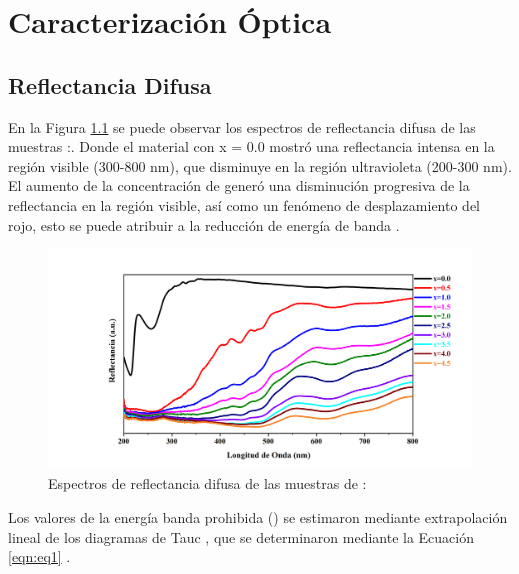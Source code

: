 \chapter{Caracterización Óptica}
\section{Reflectancia Difusa}

En la Figura \ref{fig:reflectancia} se puede observar los espectros de
reflectancia difusa de las muestras :.
Donde el material con x = 0.0 mostró una reflectancia intensa en la región
visible (300-800 nm), que disminuye en la región ultravioleta (200-300 nm).  El
aumento de la
concentración de  generó una disminución progresiva de la
reflectancia en
la región visible, así como un fenómeno de desplazamiento del rojo, esto se
puede atribuir a la reducción de energía de banda \cite{Zhou2017}.\\

\begin{figure}[h]
    \centering%

    \includegraphics[width=\textwidth]{Kap4/ReflectanciaDifusa.png}%
    \caption{Espectros de reflectancia difusa de las muestras de
    :} \label{fig:reflectancia}
\end{figure}

Los valores de la energía banda prohibida () se estimaron mediante
extrapolación
lineal de los diagramas de Tauc \cite{Deng2013}, que se determinaron mediante
la Ecuación \ref{eqn:eq1} \cite{Mott1970}.\\

\begin{equation}
    [(F(R) h \nu)^{n}=A(h \nu - E_{g})]
    \label{eqn:eq1}
\end{equation}

